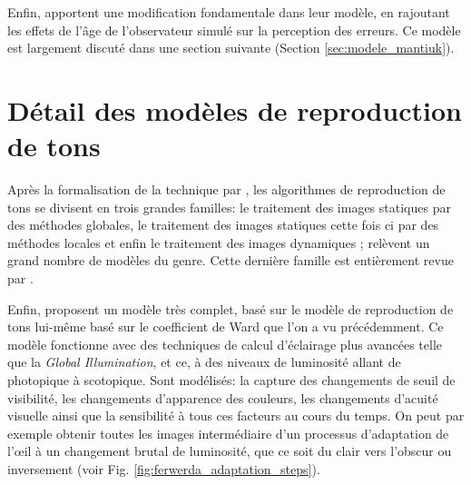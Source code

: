 	\par Enfin, \citep{mantiuk_human_2015} apportent une modification fondamentale dans leur modèle, en rajoutant les effets de l'âge de l'observateur simulé sur la perception des erreurs. Ce modèle est largement discuté dans une section suivante (Section \ref{sec:modele_mantiuk}).
	
	\section{Détail des modèles de reproduction de tons}
	\par Après la formalisation de la technique par \citep{rushmeier_comparing_1995}, les algorithmes de reproduction de tons se divisent en trois grandes familles: le traitement des images statiques par des méthodes globales, le traitement des images statiques cette fois ci par des méthodes locales et enfin le traitement des images dynamiques ; \citep{moreau_traite_2006} relèvent un grand nombre de modèles du genre. Cette dernière famille est entièrement revue par \citep{drago_perceptual_2003}.
	
	\par Enfin, \citep{ferwerda_model_1996} proposent un modèle très complet, basé sur le modèle de reproduction de tons lui-même basé sur le coefficient de Ward que l'on a vu précédemment. Ce modèle fonctionne avec des techniques de calcul d'éclairage plus avancées telle que la \textit{Global Illumination}, et ce, à des niveaux de luminosité allant de photopique à scotopique. Sont modélisés: la capture des changements de seuil de visibilité, les changements d'apparence des couleurs, les changements d'acuité visuelle ainsi que la sensibilité à tous ces facteurs au cours du temps. On peut par exemple obtenir toutes les images intermédiaire d'un processus d'adaptation de l'œil à un changement brutal de luminosité, que ce soit du clair vers l'obscur ou inversement (voir Fig. \ref{fig:ferwerda_adaptation_steps}).
	
